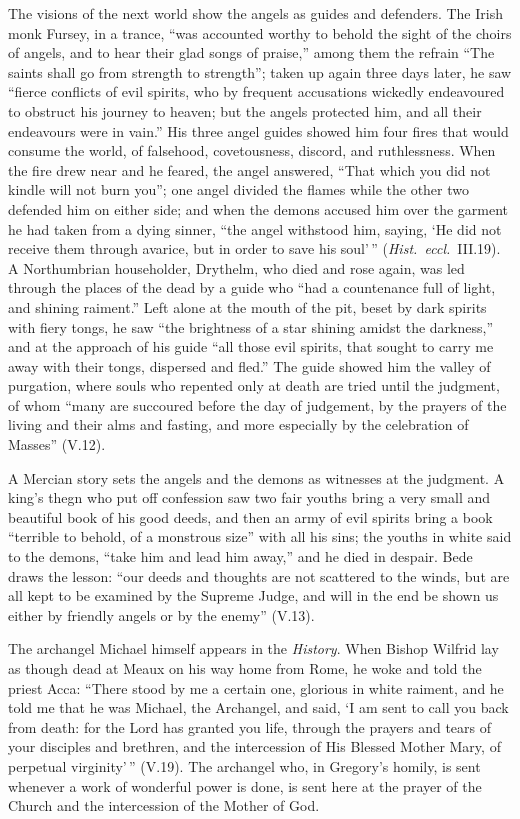 The visions of the next world show the angels as guides and defenders. The
Irish monk Fursey, in a trance, ``was accounted worthy to behold the sight of
the choirs of angels, and to hear their glad songs of praise,'' among them
the refrain ``The saints shall go from strength to strength''; taken up again
three days later, he saw ``fierce conflicts of evil spirits, who by frequent
accusations wickedly endeavoured to obstruct his journey to heaven; but the
angels protected him, and all their endeavours were in vain.'' His three
angel guides showed him four fires that would consume the world, of
falsehood, covetousness, discord, and ruthlessness. When the fire drew near
and he feared, the angel answered, ``That which you did not kindle will not
burn you''; one angel divided the flames while the other two defended him on
either side; and when the demons accused him over the garment he had taken
from a dying sinner, ``the angel withstood him, saying, `He did not receive
them through avarice, but in order to save his soul'\,'' (\emph{Hist.\
eccl.}\ III.19). A Northumbrian householder, Drythelm, who died and rose
again, was led through the places of the dead by a guide who ``had a
countenance full of light, and shining raiment.'' Left alone at the mouth of
the pit, beset by dark spirits with fiery tongs, he saw ``the brightness of a
star shining amidst the darkness,'' and at the approach of his guide ``all
those evil spirits, that sought to carry me away with their tongs, dispersed
and fled.'' The guide showed him the valley of purgation, where souls who
repented only at death are tried until the judgment, of whom ``many are
succoured before the day of judgement, by the prayers of the living and their
alms and fasting, and more especially by the celebration of Masses''
(V.12).

A Mercian story sets the angels and the demons as witnesses at the
judgment. A king's thegn who put off confession saw two fair youths bring a
very small and beautiful book of his good deeds, and then an army of evil
spirits bring a book ``terrible to behold, of a monstrous size'' with all his
sins; the youths in white said to the demons, ``take him and lead him away,''
and he died in despair. Bede draws the lesson: ``our deeds and thoughts are
not scattered to the winds, but are all kept to be examined by the Supreme
Judge, and will in the end be shown us either by friendly angels or by the
enemy'' (V.13).

The archangel Michael himself appears in the \emph{History}. When Bishop
Wilfrid lay as though dead at Meaux on his way home from Rome, he woke and
told the priest Acca: ``There stood by
me a certain one, glorious in white raiment, and he told me that he was
Michael, the Archangel, and said, `I am sent to call you back from death: for
the Lord has granted you life, through the prayers and tears of your
disciples and brethren, and the intercession of His Blessed Mother Mary, of
perpetual virginity'\,'' (V.19). The archangel who, in Gregory's homily, is
sent whenever a work of wonderful power is done, is sent here at the prayer of
the Church and the intercession of the Mother of God.

